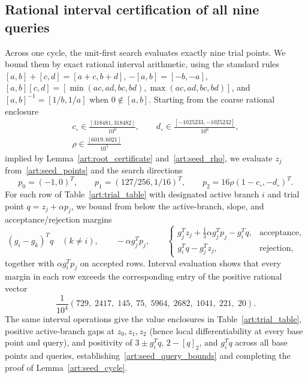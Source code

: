 \subsection{Rational interval certification of all nine queries}
Across one cycle, the unit-first search evaluates exactly nine trial points. We
bound them by exact rational interval arithmetic, using the standard rules
$[a,b]+[c,d]=[a+c,b+d]$, $-[a,b]=[-b,-a]$,
$[a,b][c,d]=[\min(ac,ad,bc,bd),\max(ac,ad,bc,bd)]$, and
$[a,b]^{-1}=[1/b,1/a]$ when $0\notin[a,b]$. Starting from the coarse rational
enclosure
\begin{equation}\label{art:query_box}
 \begin{gathered}
 c_\circ\in\frac{[318481,318482]}{10^6},\qquad
 d_\circ\in\frac{[-1025233,-1025232]}{10^6},\\
 \rho\in\frac{[6019,6021]}{10^5}
 \end{gathered}
\end{equation}
implied by Lemma~\ref{art:root_certificate} and~\eqref{art:seed_rho}, we
evaluate $z_j$ from~\eqref{art:seed_points} and the search directions
\[
 p_0=(-1,0)^T,\qquad p_1=(127/256,1/16)^T,\qquad
 p_2=16\rho(1-c_\circ,-d_\circ)^T.
\]
For each row of Table~\ref{art:trial_table} with designated active branch $i$
and trial point $q=z_j+\alpha p_j$, we bound from below the active-branch,
slope, and acceptance/rejection margins
\[
 (g_i-g_k)^Tq\quad(k\ne i),\qquad -\alpha g_j^Tp_j,\qquad
 \begin{cases}
 g_j^Tz_j+\tfrac13\alpha g_j^Tp_j-g_i^Tq,&\text{acceptance},\\
 g_i^Tq-g_j^Tz_j,&\text{rejection},
 \end{cases}
\]
together with $\alpha g_i^Tp_j$ on accepted rows. Interval evaluation shows that
every margin in each row exceeds the corresponding entry of the positive
rational vector
\begin{equation}\label{art:query_lower_bounds}
 \frac1{10^4}(729,\;2417,\;145,\;75,\;5964,\;2682,\;1041,\;221,\;20).
\end{equation}
The same interval operations give the value enclosures in Table~\ref{art:trial_table},
positive active-branch gaps at $z_0,z_1,z_2$ (hence local differentiability at
every base point and query), and positivity of $3\pm g_i^Tq$, $2-[q]_2$, and
$g_i^Tq$ across all base points and queries, establishing~\eqref{art:seed_query_bounds}
and completing the proof of Lemma~\ref{art:seed_cycle}.

